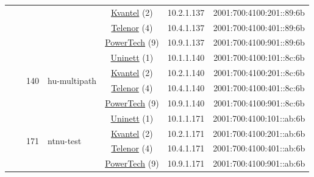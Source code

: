 \begin{small}
\begin{center}
\begin{longtable}{|c|c|c|c|c|c|c|c|}
  &  &  &  & \multicolumn{2}{|c|}{\tiny{\href{http://kvantel.no}{Kvantel} (2)}} & \tiny{10.2.1.137} & \tiny{2001:700:4100:201::89:6b} \\* \cline{5-5}\cline{6-6}\cline{7-7}\cline{8-8}
  &  &  &  & \multicolumn{2}{|c|}{\tiny{\href{https://www.telenor.no}{Telenor} (4)}} & \tiny{10.4.1.137} & \tiny{2001:700:4100:401::89:6b} \\* \cline{5-5}\cline{6-6}\cline{7-7}\cline{8-8}
  &  &  &  & \multicolumn{2}{|c|}{\tiny{\href{http://www.powertech.no}{PowerTech} (9)}} & \tiny{10.9.1.137} & \tiny{2001:700:4100:901::89:6b} \\* \cline{3-3}\cline{4-4}\cline{5-5}\cline{6-6}\cline{7-7}\cline{8-8}
  &  & \multirow{4}{*}{\tiny{140}} & \multicolumn{1}{|l|}{\multirow{4}{*}{\tiny{hu-multipath}}} & \multicolumn{2}{|c|}{\tiny{\href{https://www.uninett.no}{Uninett} (1)}} & \tiny{10.1.1.140} & \tiny{2001:700:4100:101::8c:6b} \\* \cline{5-5}\cline{6-6}\cline{7-7}\cline{8-8}
  &  &  &  & \multicolumn{2}{|c|}{\tiny{\href{http://kvantel.no}{Kvantel} (2)}} & \tiny{10.2.1.140} & \tiny{2001:700:4100:201::8c:6b} \\* \cline{5-5}\cline{6-6}\cline{7-7}\cline{8-8}
  &  &  &  & \multicolumn{2}{|c|}{\tiny{\href{https://www.telenor.no}{Telenor} (4)}} & \tiny{10.4.1.140} & \tiny{2001:700:4100:401::8c:6b} \\* \cline{5-5}\cline{6-6}\cline{7-7}\cline{8-8}
  &  &  &  & \multicolumn{2}{|c|}{\tiny{\href{http://www.powertech.no}{PowerTech} (9)}} & \tiny{10.9.1.140} & \tiny{2001:700:4100:901::8c:6b} \\* \cline{3-3}\cline{4-4}\cline{5-5}\cline{6-6}\cline{7-7}\cline{8-8}
  &  & \multirow{4}{*}{\tiny{171}} & \multicolumn{1}{|l|}{\multirow{4}{*}{\tiny{ntnu-test}}} & \multicolumn{2}{|c|}{\tiny{\href{https://www.uninett.no}{Uninett} (1)}} & \tiny{10.1.1.171} & \tiny{2001:700:4100:101::ab:6b} \\* \cline{5-5}\cline{6-6}\cline{7-7}\cline{8-8}
  &  &  &  & \multicolumn{2}{|c|}{\tiny{\href{http://kvantel.no}{Kvantel} (2)}} & \tiny{10.2.1.171} & \tiny{2001:700:4100:201::ab:6b} \\* \cline{5-5}\cline{6-6}\cline{7-7}\cline{8-8}
  &  &  &  & \multicolumn{2}{|c|}{\tiny{\href{https://www.telenor.no}{Telenor} (4)}} & \tiny{10.4.1.171} & \tiny{2001:700:4100:401::ab:6b} \\* \cline{5-5}\cline{6-6}\cline{7-7}\cline{8-8}
  &  &  &  & \multicolumn{2}{|c|}{\tiny{\href{http://www.powertech.no}{PowerTech} (9)}} & \tiny{10.9.1.171} & \tiny{2001:700:4100:901::ab:6b} \\* \cline{3-3}\cline{4-4}\cline{5-5}\cline{6-6}\cline{7-7}\cline{8-8}

\end{longtable}
\end{center}
\end{small}
